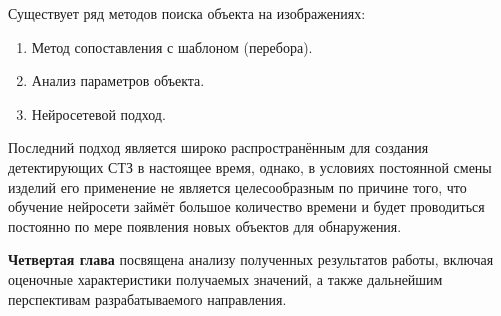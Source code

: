 Существует ряд методов поиска объекта на изображениях:

\begin{enumerate}
	\item Метод сопоставления с шаблоном (перебора).
	\item Анализ параметров объекта.
	\item Нейросетевой подход.
\end{enumerate}

Последний подход является широко распространённым для создания детектирующих СТЗ в настоящее время, однако, в условиях постоянной смены изделий его применение не является целесообразным по причине того, что обучение нейросети займёт большое количество времени и будет проводиться постоянно по мере появления новых объектов для обнаружения.

\textbf{Четвертая глава} посвящена анализу полученных результатов работы, включая оценочные характеристики получаемых значений, а также дальнейшим перспективам разрабатываемого направления.
